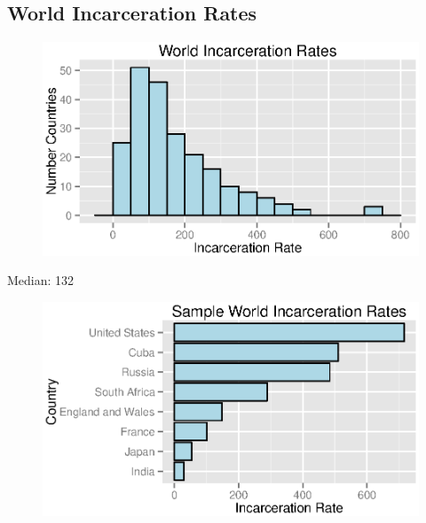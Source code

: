 \documentclass{exam}
\begin{document}
  \subsection{World Incarceration Rates}
  \begin{figure}[H]
    \centering
    \includegraphics[scale = 0.9]{world_rate_histogram.eps}
  \end{figure}

  Median: 132

  \begin{figure}[H]
    \centering
    \includegraphics[scale = 0.9]{world_rates.eps}
  \end{figure}
\end{document}
